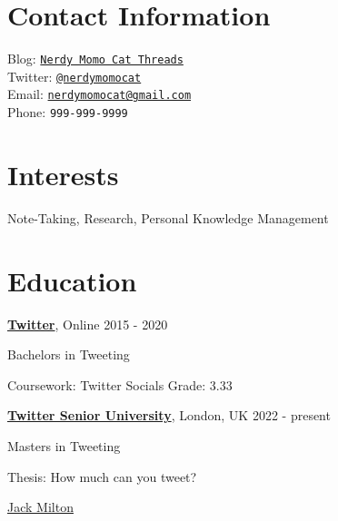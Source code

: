 




\section{Contact Information}

Blog: \href{https://typefully.com/nerdymomocat}{\texttt{Nerdy Momo Cat Threads}}\\
Twitter: \href{https://twitter.com/nerdymomocat}{\texttt{@nerdymomocat}}\\
Email: \href{mailto:nerdymomocat@gmail.com}{\texttt{nerdymomocat@gmail.com}}\\
Phone: {\texttt{999-999-9999}}\\


\section{Interests}

Note-Taking, Research, Personal Knowledge Management


\section{Education}

\href{www.twitteruniversity.com}{\textbf{Twitter}},
Online \hfill {2015 - 2020} \\
\vspace{-.15in}
\begin{innerlist}
\item[] Bachelors in Tweeting
\item[] Coursework: Twitter Socials
Grade: 3.33
\item[] 
\end{innerlist}
\vspace{.1in}
\href{www.twittersenioruniversity.com}{\textbf{Twitter Senior University}},
London, UK \hfill {2022 - present} \\
\vspace{-.15in}
\begin{innerlist}
\item[] Masters in Tweeting
\item[] Thesis: How much can you tweet?
\item[] \href{https://jackbox.tv/}{Jack Milton}
\end{innerlist}
\vspace{.1in}


